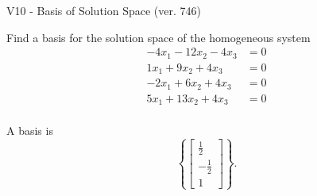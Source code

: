 \begin{exercise}
  \begin{exerciseTitle}V10 - Basis of Solution Space (ver. 746)\end{exerciseTitle}
  \begin{exerciseStatement}
    Find a basis for the solution space of the homogeneous system 
\begin{align*}
 -4 x_ 1 -12 x_ 2 -4 x_ 3 &= 0  \\ 
  1 x_ 1 + 9 x_ 2 + 4 x_ 3 &= 0  \\ 
  -2 x_ 1 + 6 x_ 2 + 4 x_ 3 &= 0  \\ 
  5 x_ 1 + 13 x_ 2 + 4 x_ 3 &= 0  \\ 
 \end{align*}


 
  \end{exerciseStatement}

  \begin{exerciseAnswer}
   A basis is   
\[\left\{\left[\begin{array}{c}
\frac{1}{2} \\
-\frac{1}{2} \\
1
\end{array}\right]\right\}.\]

  


  \end{exerciseAnswer}
\end{exercise}